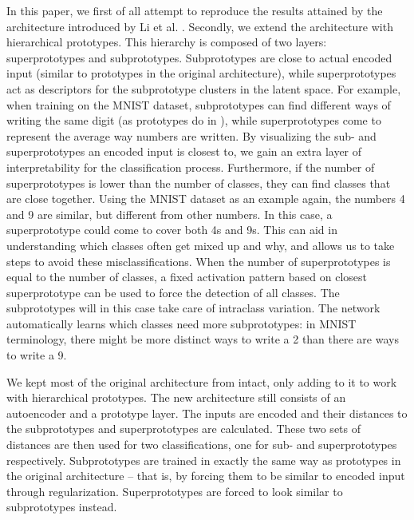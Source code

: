 In this paper, we first of all attempt to reproduce the results attained by the architecture introduced by Li et al. \citep{li2018deep}. Secondly, we extend the architecture with hierarchical prototypes. This hierarchy is composed of two layers: superprototypes and subprototypes. Subprototypes are close to actual encoded input (similar to prototypes in the original architecture), while superprototypes act as descriptors for the subprototype clusters in the latent space. For example, when training on the MNIST dataset, subprototypes can find different ways of writing the same digit (as prototypes do in \citep{li2018deep}), while superprototypes come to represent the average way numbers are written. By visualizing the sub- and superprototypes an encoded input is closest to, we gain an extra layer of interpretability for the classification process. Furthermore, if the number of superprototypes is lower than the number of classes, they can find classes that are close together. Using the MNIST dataset as an example again, the numbers 4 and 9 are similar, but different from other numbers. In this case, a superprototype could come to cover both 4s and 9s. This can aid in understanding which classes often get mixed up and why, and allows us to take steps to avoid these misclassifications. When the number of superprototypes is equal to the number of classes, a fixed activation pattern based on closest superprototype can be used to force the detection of all classes. The subprototypes will in this case take care of intraclass variation. The network automatically learns which classes need more subprototypes: in MNIST terminology, there might be more distinct ways to write a 2 than there are ways to write a 9. 

We kept most of the original architecture from \citep{li2018deep} intact, only adding to it to work with hierarchical prototypes. The new architecture still consists of an autoencoder and a prototype layer. The inputs are encoded and their distances to the subprototypes and superprototypes are calculated. These two sets of distances are then used for two classifications, one for sub- and superprototypes respectively. Subprototypes are trained in exactly the same way as prototypes in the original architecture -- that is, by forcing them to be similar to encoded input through regularization. Superprototypes are forced to look similar to subprototypes instead.
